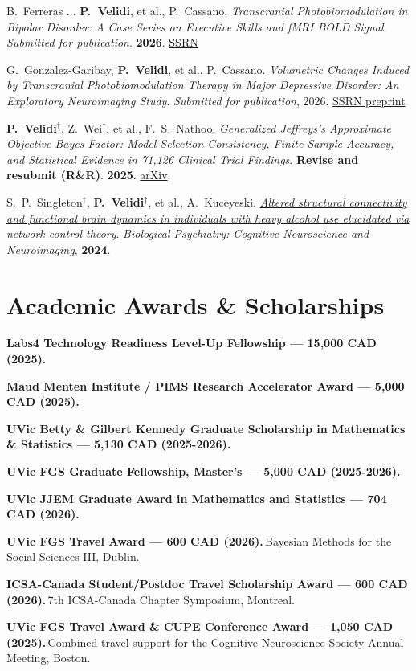 \documentclass[9pt]{extarticle}
\newcommand{\award}[2]{\textbf{#1}\,#2\par\vspace{0.5pt}}
\begin{document}
{B.\ Ferreras ... \textbf{P.\ Velidi}, et al., P.\ Cassano.
\textit{Transcranial Photobiomodulation in Bipolar Disorder: A Case Series on Executive Skills and fMRI BOLD Signal}.
\textit{Submitted for publication}. \textbf{2026}. \href{https://papers.ssrn.com/sol3/papers.cfm?abstract_id=7457979}{SSRN}
\par\vspace{1pt}

G.\ Gonzalez-Garibay, \textbf{P.\ Velidi}, et al., P.\ Cassano.
\textit{Volumetric Changes Induced by Transcranial Photobiomodulation Therapy in Major Depressive Disorder: An Exploratory Neuroimaging Study}.
\textit{Submitted for publication}, 2026. \href{https://papers.ssrn.com/abstract=7480518}{SSRN preprint}


\textbf{P.\ Velidi}$^\dagger$, Z.\ Wei$^\dagger$, et al., F.\ S.\ Nathoo.
\textit{Generalized Jeffreys's Approximate Objective Bayes Factor: Model-Selection Consistency, Finite-Sample Accuracy, and Statistical Evidence in 71{,}126 Clinical Trial Findings}.
\textbf{Revise and resubmit (R\&R)}. \textbf{2025}. \href{https://arxiv.org/abs/2510.10358}{arXiv}.\par\vspace{1pt}

S.\ P.\ Singleton$^\dagger$, \textbf{P.\ Velidi}$^\dagger$, et al., A.\ Kuceyeski. \href{https://www.biologicalpsychiatrycnni.org/article/S2451-9022(24)00139-3/abstract}{\textit{Altered structural connectivity and functional brain dynamics in individuals with heavy alcohol use elucidated via network control theory}.}
\textit{Biological Psychiatry: Cognitive Neuroscience and Neuroimaging}, \textbf{2024}.
}

\section{Academic Awards \& Scholarships}
\award{Labs4 Technology Readiness Level-Up Fellowship --- 15{,}000 CAD (2025).}{}
\award{Maud Menten Institute / PIMS Research Accelerator Award --- 5{,}000 CAD (2025).}{}
\award{UVic Betty \& Gilbert Kennedy Graduate Scholarship in Mathematics \& Statistics --- 5{,}130 CAD (2025-2026).}{}
\award{UVic FGS Graduate Fellowship, Master's --- 5{,}000 CAD (2025-2026).}{}
\award{UVic JJEM Graduate Award in Mathematics and Statistics --- 704 CAD (2026).}{}
\award{UVic FGS Travel Award --- 600 CAD (2026).}{Bayesian Methods for the Social Sciences III, Dublin.}
\award{ICSA-Canada Student/Postdoc Travel Scholarship Award --- 600 CAD (2026).}{7th ICSA-Canada Chapter Symposium, Montreal.}
\award{UVic FGS Travel Award \& CUPE Conference Award --- 1{,}050 CAD (2025).}{Combined travel support for the Cognitive Neuroscience Society Annual Meeting, Boston.}
\end{document}
